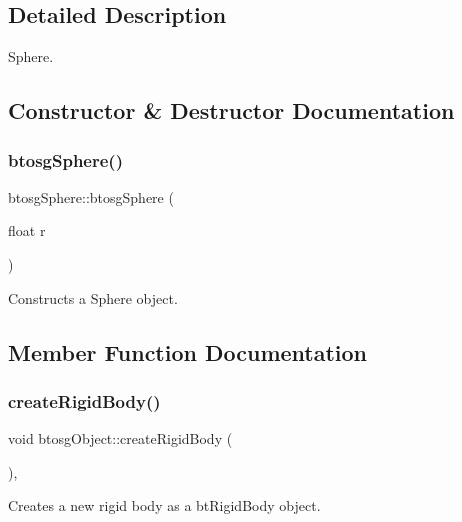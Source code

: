 \subsection{Detailed Description}
Sphere. 

\subsection{Constructor \& Destructor Documentation}
\mbox{\label{classbtosgSphere_a39cc5391405e85edcef16200b52e905c}} 
\subsubsection{\texorpdfstring{btosg\+Sphere()}{btosgSphere()}}
{\footnotesize\ttfamily btosg\+Sphere\+::btosg\+Sphere (\begin{DoxyParamCaption}\item[{float}]{r }\end{DoxyParamCaption})\hspace{0.3cm}{\ttfamily [inline]}}

Constructs a Sphere object. 

\subsection{Member Function Documentation}
\mbox{\label{classbtosgObject_a029dbe9134fa94e7355799f67fb2cd6d}} 
\subsubsection{\texorpdfstring{create\+Rigid\+Body()}{createRigidBody()}}
{\footnotesize\ttfamily void btosg\+Object\+::create\+Rigid\+Body (\begin{DoxyParamCaption}{ }\end{DoxyParamCaption})\hspace{0.3cm}{\ttfamily [inline]}, {\ttfamily [inherited]}}

Creates a new rigid body as a bt\+Rigid\+Body object. \mbox{\label{classbtosgObject_a2019ec63bde02b72600450c7c985e77a}} 
